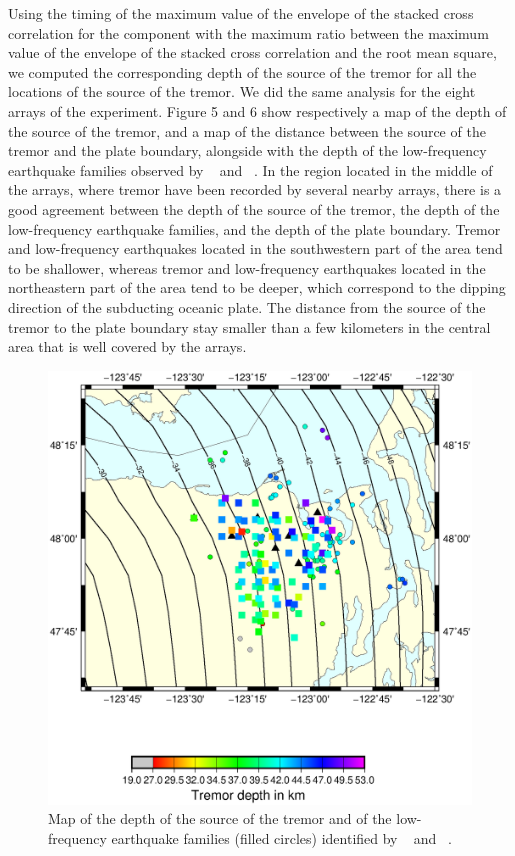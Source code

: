 \documentclass[draft]{agujournal2019}
\begin{document}
Using the timing of the maximum value of the envelope of the stacked cross correlation for the component with the maximum ratio between the maximum value of the envelope of the stacked cross correlation and the root mean square, we computed the corresponding depth of the source of the tremor for all the locations of the source of the tremor. We did the same analysis for the eight arrays of the experiment. Figure 5 and 6 show respectively a map of the depth of the source of the tremor, and a map of the distance between the source of the tremor and the plate boundary, alongside with the depth of the low-frequency earthquake families observed by ~ and ~. In the region located in the middle of the arrays, where tremor have been recorded by several nearby arrays, there is a good agreement between the depth of the source of the tremor, the depth of the low-frequency earthquake families, and the depth of the plate boundary. Tremor and low-frequency earthquakes located in the southwestern part of the area tend to be shallower, whereas tremor and low-frequency earthquakes located in the northeastern part of the area tend to be deeper, which correspond to the dipping direction of the subducting oceanic plate. The distance from the source of the tremor to the plate boundary stay smaller than a few kilometers in the central area that is well covered by the arrays.

\begin{figure}
\noindent\includegraphics[width=\textwidth, trim={1cm 5cm 2cm 6cm},clip]{figures/depth_PWS_PWS.eps}
\caption{Map of the depth of the source of the tremor and of the low-frequency earthquake families (filled circles) identified by ~ and ~.}
\label{pngfiguresample}
\end{figure}
\end{document}
